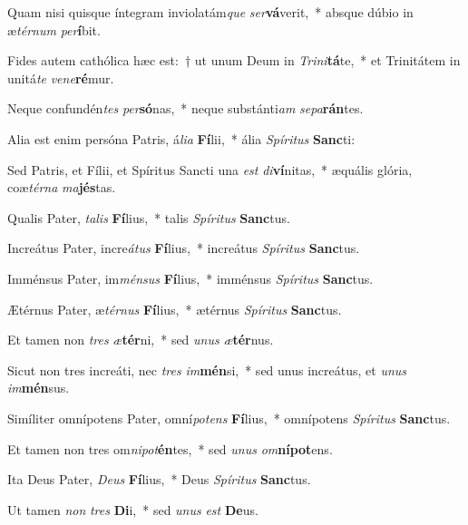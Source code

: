 \item Quam nisi quisque íntegram inviolatám\textit{que} \textit{ser}\textbf{vá}verit,~* absque dúbio in æ\textit{tér}\textit{num} \textit{per}\textbf{í}bit.
\item Fides autem cathólica hæc est:~† ut unum Deum in \textit{Tri}\textit{ni}\textbf{tá}te,~* et Trinitátem in unitá\textit{te} \textit{ve}\textit{ne}\textbf{ré}mur.
\item Neque confundén\textit{tes} \textit{per}\textbf{só}nas,~* neque substánti\textit{am} \textit{se}\textit{pa}\textbf{rán}tes.
\item Alia est enim persóna Patris, á\textit{li}\textit{a} \textbf{Fí}lii,~* ália \textit{Spí}\textit{ri}\textit{tus} \textbf{Sanc}ti:
\item Sed Patris, et Fílii, et Spíritus Sancti una \textit{est} \textit{di}\textbf{ví}nitas,~* æquális glória, coæ\textit{tér}\textit{na} \textit{ma}\textbf{jés}tas.
\item Qualis Pater, \textit{ta}\textit{lis} \textbf{Fí}lius,~* talis \textit{Spí}\textit{ri}\textit{tus} \textbf{Sanc}tus.
\item Increátus Pater, incre\textit{á}\textit{tus} \textbf{Fí}lius,~* increátus \textit{Spí}\textit{ri}\textit{tus} \textbf{Sanc}tus.
\item Imménsus Pater, im\textit{mén}\textit{sus} \textbf{Fí}lius,~* imménsus \textit{Spí}\textit{ri}\textit{tus} \textbf{Sanc}tus.
\item Ætérnus Pater, æ\textit{tér}\textit{nus} \textbf{Fí}lius,~* ætérnus \textit{Spí}\textit{ri}\textit{tus} \textbf{Sanc}tus.
\item Et tamen non \textit{tres} \textit{æ}\textbf{tér}ni,~* sed \textit{u}\textit{nus} \textit{æ}\textbf{tér}nus.
\item Sicut non tres increáti, nec \textit{tres} \textit{im}\textbf{mén}si,~* sed unus increátus, et \textit{u}\textit{nus} \textit{im}\textbf{mén}sus.
\item Simíliter omnípotens Pater, omní\textit{pot}\textit{ens} \textbf{Fí}lius,~* omnípotens \textit{Spí}\textit{ri}\textit{tus} \textbf{Sanc}tus.
\item Et tamen non tres om\textit{ni}\textit{pot}\textbf{én}tes,~* sed \textit{u}\textit{nus} \textit{om}\textbf{ní}\textbf{pot}ens.
\item Ita Deus Pater, \textit{De}\textit{us} \textbf{Fí}lius,~* Deus \textit{Spí}\textit{ri}\textit{tus} \textbf{Sanc}tus.
\item Ut tamen \textit{non} \textit{tres} \textbf{Di}i,~* sed \textit{u}\textit{nus} \textit{est} \textbf{De}us.
